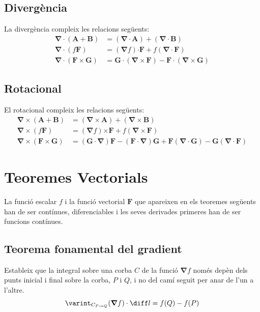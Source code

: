 \documentclass[catalan,a4paper,twoside,11pt]{article}
\begin{document}
\subsection{Divergència}
La divergència compleix les relacions següents:
\begin{align}
    \boldsymbol{\nabla\cdot}(\boldsymbol{A}+\boldsymbol{B}) &= (\boldsymbol{\nabla\cdot A}) +
    (\boldsymbol{\nabla\cdot B})\\
    \boldsymbol{\nabla\cdot}(f\boldsymbol{F}) &=
    (\boldsymbol{\nabla}f)\boldsymbol{\cdot F} + f(\boldsymbol{\nabla\cdot F})\\
       \boldsymbol{\nabla\cdot}(\boldsymbol{F\times G}) &=
    \boldsymbol{G\cdot}(\boldsymbol{\nabla\times F}) -
    \boldsymbol{F\cdot}(\boldsymbol{\nabla\times G})
\end{align}

\subsection{Rotacional}
El rotacional compleix les relacions següents:
\begin{align}
    \boldsymbol{\nabla\times}(\boldsymbol{A}+\boldsymbol{B}) &= (\boldsymbol{\nabla\times A}) + (\boldsymbol{\nabla\times B})\\
    \boldsymbol{\nabla\times}(f\boldsymbol{F}) &=
    (\boldsymbol{\nabla}f)\boldsymbol{\times F} + f(\boldsymbol{\nabla\times F})\\
    \boldsymbol{\nabla\times}(\boldsymbol{F\times G}) &= (\boldsymbol{G\cdot\nabla})\boldsymbol{F} - (\boldsymbol{F\cdot\nabla})\boldsymbol{G} + \boldsymbol{F}(\boldsymbol{\nabla\cdot G}) - \boldsymbol{G}(\boldsymbol{\nabla\cdot F})
\end{align}


\section{Teoremes Vectorials}

La funció escalar $f$ i la funció vectorial $\boldsymbol{F}$ que apareixen en els teoremes següents han de ser contínues, diferenciables i les seves derivades primeres han de ser funcions contínues.

\subsection{Teorema fonamental del gradient}
Estableix que la integral sobre una corba $C$ de la funció $\boldsymbol{\nabla} f$ només depèn dels punts inicial i final sobre la corba, $P$ i $Q$, i no del camí seguit per anar de l'un a l'altre.
\begin{equation}
    \varint_{C_{P\rightarrow Q}} (\boldsymbol{\nabla}f) \cdot \diff l = f(Q)-f(P)
\end{equation}
\end{document}
